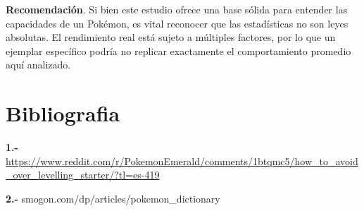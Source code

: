 \documentclass[oneside,11pt]{Latex/Classes/PhDthesisPSnPDF}
\begin{document}
\textbf{Recomendación}. Si bien este estudio ofrece una base sólida para
entender las capacidades de un Pokémon, es vital reconocer que las
estadísticas no son leyes absolutas. El rendimiento real está sujeto a
múltiples factores, por lo que un ejemplar específico podría no replicar
exactamente el comportamiento promedio aquí analizado.

\newpage

\chapter{Bibliografia}

\textbf{1.-}
\url{https://www.reddit.com/r/PokemonEmerald/comments/1btqmc5/how_to_avoid_over_levelling_starter/?tl=es-419}

\textbf{2.-} smogon.com/dp/articles/pokemon\_dictionary

\renewcommand{\bibname}{Lista de Referencias}
 
 

\end{document}
